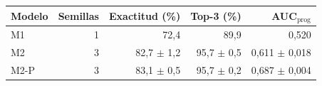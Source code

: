 \begin{tabular}{lrrrr}
\toprule
Modelo & Semillas & Exactitud (\%) & Top-3 (\%) & AUC$_{\mathrm{prog}}$ \\
\midrule
M1 & 1 & 72,4 & 89,9 & 0,520 \\
M2 & 3 & 82,7 $\pm$ 1,2 & 95,7 $\pm$ 0,5 & 0,611 $\pm$ 0,018 \\
M2-P & 3 & 83,1 $\pm$ 0,5 & 95,7 $\pm$ 0,2 & 0,687 $\pm$ 0,004 \\
\bottomrule
\end{tabular}
